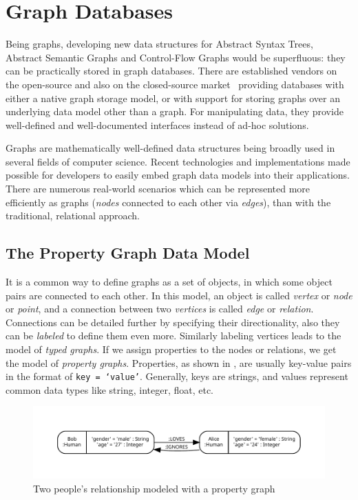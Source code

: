 \section{Graph Databases}

Being graphs, developing new data structures for Abstract Syntax Trees, Abstract Semantic Graphs and Control-Flow Graphs would be superfluous: they can be practically stored in graph databases. There are established vendors on the open-source and also on the closed-source market~\cite{ibm-graph, arangodb-graph, datastax-graph, neo4j-website, orientdb-graph} providing databases with either a native graph storage model, or with support for storing graphs over an underlying data model other than a graph. For manipulating data, they provide well-defined and well-documented interfaces instead of ad-hoc solutions.

Graphs are mathematically well-defined data structures being broadly used in several fields of computer science. Recent technologies and implementations made possible for developers to easily embed graph data models into their applications. There are numerous real-world scenarios which can be represented more efficiently as graphs (\emph{nodes} connected to each other via \emph{edges}), than with the traditional, relational approach.

\subsection{The Property Graph Data Model}

It is a common way to define graphs as a set of objects, in which some object pairs are connected to each other. In this model, an object is called \emph{vertex} or \emph{node} or \emph{point}, and a connection between two \emph{vertices} is called \emph{edge} or \emph{relation}. Connections can be detailed further by specifying their directionality, also they can be \emph{labeled} to define them even more. Similarly labeling vertices leads to the model of \emph{typed graphs}. If we assign properties to the nodes or relations, we get the model of \emph{property graphs}. Properties, as shown in , are usually key-value pairs in the format of \texttt{key = `value'}. Generally, keys are strings, and values represent common data types like string, integer, float, etc.

\begin{figure}[!htb]
	\centering
	\includegraphics[width=\textwidth, trim=1cm 1cm 1cm 1cm,clip]{figures/property-graph.pdf}
	\caption{Two people's relationship modeled with a property graph}
	\label{fig:property-graph}
\end{figure}

